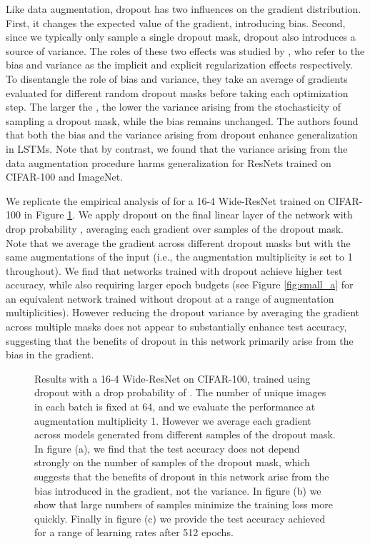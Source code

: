 \documentclass{article}
\begin{document}
Like data augmentation, dropout has two influences on the gradient distribution. First, it changes the expected value of the gradient, introducing bias. Second, since we typically only sample a single dropout mask, dropout also introduces a source of variance. The roles of these two effects was studied by \citet{wei2020implicit}, who refer to the bias and variance as the implicit and explicit regularization effects respectively. To disentangle the role of bias and variance, they take an average of  gradients evaluated for  different random dropout masks before taking each optimization step. The larger the , the lower the variance arising from the stochasticity of sampling a dropout mask, while the bias remains unchanged. The authors found that both the bias and the variance arising from dropout enhance generalization in LSTMs. Note that by contrast, we found that the variance arising from the data augmentation procedure harms generalization for ResNets trained on CIFAR-100 and ImageNet.

We replicate the empirical analysis of \citet{wei2020implicit} for a 16-4 Wide-ResNet trained on CIFAR-100 in Figure \ref{fig:dropout}. We apply dropout on the final linear layer of the network with drop probability , averaging each gradient over  samples of the dropout mask. Note that we average the gradient across different dropout masks but with the same augmentations of the input (i.e., the augmentation multiplicity is set to 1 throughout). We find that networks trained with dropout achieve higher test accuracy, while also requiring larger epoch budgets (see Figure \ref{fig:small_a} for an equivalent network trained without dropout at a range of augmentation multiplicities). However reducing the dropout variance by averaging the gradient across multiple masks does not appear to substantially enhance test accuracy, suggesting that the benefits of dropout in this network primarily arise from the bias in the gradient.



\begin{figure}[t]
\centering
  \vskip -1mm
  \vskip -2mm
\caption{Results with a 16-4 Wide-ResNet on CIFAR-100, trained using dropout with a drop probability of . The number of unique images in each batch is fixed at 64, and we evaluate the performance at augmentation multiplicity 1. However we average each gradient across  models generated from  different samples of the dropout mask. In figure (a), we find that the test accuracy does not depend strongly on the number of samples of the dropout mask, which suggests that the benefits of dropout in this network arise from the bias introduced in the gradient, not the variance. In figure (b) we show that large numbers of samples minimize the training loss more quickly. Finally in figure (c) we provide the test accuracy achieved for a range of learning rates after 512 epochs.}
\label{fig:dropout}
  \vskip -2mm
\end{figure}
\end{document}
